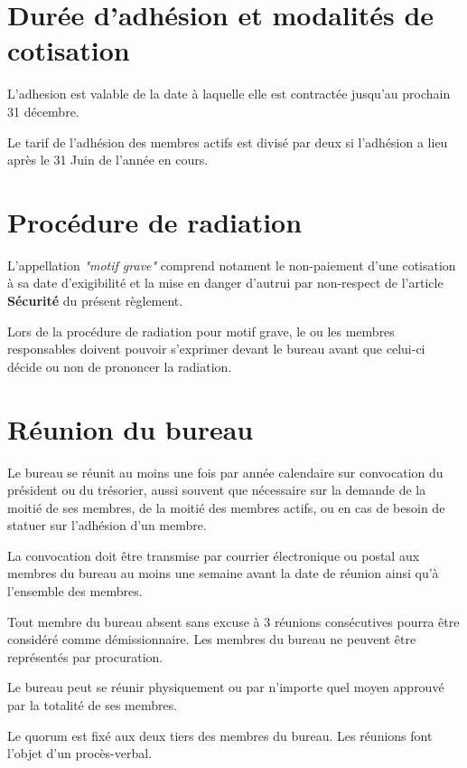\documentclass[a4paper, 11pt]{article}
\begin{document}

\section{Durée d'adhésion et modalités de cotisation} %

L'adhesion est valable de la date à laquelle elle est contractée jusqu'au prochain 31 décembre.

Le tarif de l'adhésion des membres actifs est divisé par deux si l'adhésion a lieu après le 31 Juin de l'année en cours.


\section{Procédure de radiation} %

L'appellation \textit{"motif grave"}  comprend notament le non-paiement d'une cotisation à sa date d'exigibilité et la mise en danger d'autrui par non-respect de l'article \textbf{Sécurité} du présent règlement.

Lors de la procédure de radiation pour motif grave, le ou les membres responsables doivent pouvoir s'exprimer devant le
bureau avant que celui-ci décide ou non de prononcer la radiation.


\section{Réunion du bureau} %

Le bureau se réunit au moins une fois par année calendaire sur convocation du président ou du trésorier, aussi souvent
que nécessaire sur la demande de la moitié de ses membres, de la moitié des membres actifs, ou en cas de besoin de
statuer sur l'adhésion d'un membre.

La convocation doit être transmise par courrier électronique ou postal aux membres du bureau au moins une semaine avant
la date de réunion ainsi qu'à l'ensemble des membres.

Tout membre du bureau absent sans excuse à 3 réunions consécutives pourra être considéré comme démissionnaire.
Les membres du bureau ne peuvent être représentés par procuration.

Le bureau peut se réunir physiquement ou par n'importe quel moyen approuvé par la totalité de ses membres.

Le quorum est fixé aux deux tiers des membres du bureau.
Les réunions font l'objet d'un procès-verbal.
\end{document}
